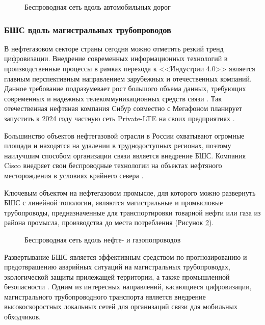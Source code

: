 \begin{figure}[ht]
  \caption{Беспроводная сеть вдоль автомобильных дорог}\label{fig:part2_roadisdeunit}
\end{figure}

\subsubsection{БШС вдоль магистральных трубопроводов}

В нефтегазовом секторе страны сегодня можно отметить резкий тренд цифровизации.  Внедрение современных информационных технологий в производственные процессы в рамках перехода к <<Индустрии 4.0>> является главным перспективным направлением зарубежных и отечественных компаний. Данное требование подразумевает рост большого объема данных, требующих современных и надежных телекоммуникационных средств связи \cite{sibur, cambiumnetworks_wireless, cisco_oil_gas, cisco_oil_gas, gegridsolutions_wireless, cisco_oil_gas}. Так отечественная нефтяная компания Сибур совместно с Мегафоном планирует запустить к 2024 году частную сеть Private-LTE на своих предприятиях \cite{sibur}. 

Большинство объектов нефтегазовой отрасли в России охватывают огромные площади и находятся на удалении в труднодоступных регионах, поэтому наилучшим способом организации связи является внедрение БШС. Компания Cisco внедряет свои беспроводные технологии на объектах нефтяного месторождения в условиях крайнего севера \cite{cisco_oil_gas}.


Ключевым объектом на нефтегазовом промысле, для которого можно развернуть БШС с линейной топологии, являются магистральные и промысловые трубопроводы, предназначенные для транспортировки товарной нефти или газа из района промысла, производства до места потребления \cite{Deineko2018} (Рисунок \ref{fig:part2_pipeline}). 

\begin{figure}[ht]
  \caption{Беспроводная сеть вдоль нефте- и газопопроводов}\label{fig:part2_pipeline}
\end{figure}

Развертывание БШС является эффективным средством по прогнозированию и предотвращению аварийных ситуаций на магистральных трубопроводах, экологической защиты прилежащей территории, а также промышленной безопасности \cite{Krzyszton2021,Mehmood2016, Lin2019, Adegboye2019, Lin2019}. Одним из интересных направлений, касающиеся цифровизации, магистрального трубопроводного транспорта является внедрение высокоскоростных локальных сетей для организаций связи для мобильных обходчиков. 

